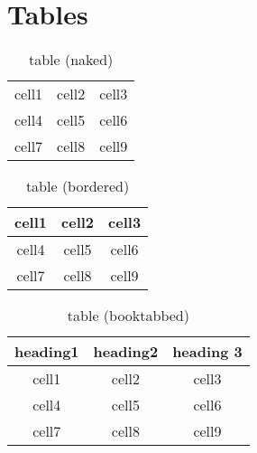 \section{Tables}
\begin{table}[H]
	\begin{center}
		\begin{tabular}{ c c c }
		cell1 & cell2 & cell3 \\ 
		cell4 & cell5 & cell6 \\  
		cell7 & cell8 & cell9    
		\end{tabular}
	\end{center}	
	\caption{table (naked)}
\end{table}

\begin{table}[H]
	\begin{center}
		\begin{tabular}{| c | c | c |}
			\hline
			cell1 & cell2 & cell3 \\
			\hline 
			cell4 & cell5 & cell6 \\  
			\hline
			cell7 & cell8 & cell9 \\
			\hline    
		\end{tabular}
	\end{center}
	\caption{table (bordered)}	
\end{table}

\begin{table}[H]
	\begin{center}
		\begin{tabular}{ c c c }
		\toprule
		heading1 & heading2 & heading 3 \\
		\midrule		
		cell1 & cell2 & cell3 \\ 
		cell4 & cell5 & cell6 \\  
		cell7 & cell8 & cell9 \\
		\bottomrule   
		\end{tabular}
	\end{center}
	\caption{table (booktabbed)}	
\end{table}